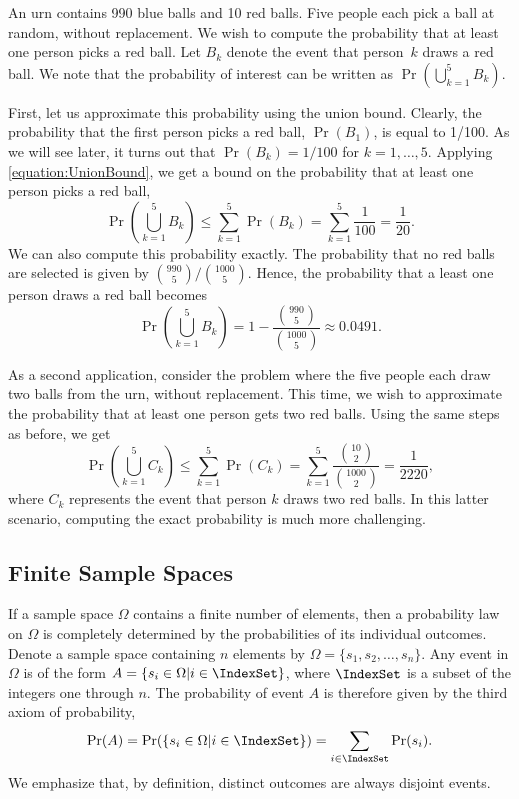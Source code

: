\begin{example}
An urn contains 990 blue balls and 10 red balls.
Five people each pick a ball at random, without replacement.
We wish to compute the probability that at least one person picks a red ball.
Let $B_k$ denote the event that person~$k$ draws a red ball.
We note that the probability of interest can be written as $\Pr \left( \bigcup_{k=1}^5 B_k \right)$.

First, let us approximate this probability using the union bound.
Clearly, the probability that the first person picks a red ball, $\Pr (B_1)$, is equal to 1/100.
As we will see later, it turns out that $\Pr (B_k) = 1/100$ for $k=1,\ldots,5$.
Applying \eqref{equation:UnionBound}, we get a bound on the probability that at least one person picks a red ball,
\begin{equation*}
\Pr \left( \bigcup_{k=1}^5 B_k \right)
\leq \sum_{k=1}^5 \Pr ( B_k )
= \sum_{k=1}^5 \frac{1}{100} = \frac{1}{20} .
\end{equation*}
We can also compute this probability exactly.
The probability that no red balls are selected is given by $\binom{990}{5} / \binom{1000}{5}$.
Hence, the probability that a least one person draws a red ball becomes
\begin{equation*}
\Pr \left( \bigcup_{k=1}^5 B_k \right)
= 1 - \frac{\binom{990}{5}}{\binom{1000}{5}}
\approx 0.0491 .
\end{equation*}

As a second application, consider the problem where the five people each draw two balls from the urn, without replacement.
This time, we wish to approximate the probability that at least one person gets two red balls.
Using the same steps as before, we get
\begin{equation*}
\Pr \left( \bigcup_{k=1}^5 C_k \right)
\leq \sum_{k=1}^5 \Pr ( C_k )
= \sum_{k=1}^5 \frac{\binom{10}{2}}{\binom{1000}{2}} = \frac{1}{2220} ,
\end{equation*}
where $C_k$ represents the event that person $k$ draws two red balls.
In this latter scenario, computing the exact probability is much more challenging.
\end{example}


\subsection{Finite Sample Spaces}
\label{section:FiniteSampleSpaces}

If a sample space $\Omega$ contains a finite number of elements, then a probability law on $\Omega$ is completely determined by the probabilities of its individual outcomes.
Denote a sample space containing $n$ elements by $\Omega = \{ s_1, s_2, \ldots, s_n \}$.
Any event in $\Omega$ is of the form $A = \{ s_i \in \Omega | i \in \IndexSet \}$, where $\IndexSet$ is a subset of the integers one through $n$.
The probability of event $A$ is therefore given by the third axiom of probability,
\begin{equation*}
\Pr (A)
= \Pr ( \{ s_i \in \Omega | i \in \IndexSet \} )
= \sum_{i \in \IndexSet} \Pr (s_i) .
\end{equation*}
We emphasize that, by definition, distinct outcomes are always disjoint events.


